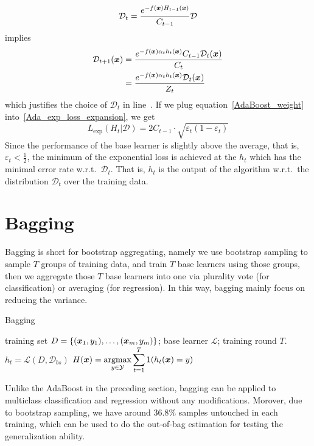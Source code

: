 $$\mathcal{D}_t = \frac{e^{-f(\boldsymbol{x})H_{t-1}(\boldsymbol{x})}}{C_{t-1}} \mathcal{D}$$
implies
\begin{align}
\mathcal{D}_{t+1}(\boldsymbol{x}) &= \frac{e^{-f(\boldsymbol{x})\alpha_t h_t(\boldsymbol{x})}C_{t-1}\mathcal{D}_t(\boldsymbol{x})}{C_t}\nonumber\\
                         &= \frac{e^{-f(\boldsymbol{x})\alpha_t h_t(\boldsymbol{x})}\mathcal{D}_t(\boldsymbol{x})}{Z_t}
\end{align}
which justifies the choice of $\mathcal{D}_t$ in line~. If we plug
equation~\eqref{AdaBoost_weight} into~\eqref{Ada_exp_loss_expansion}, we get
$$L_{\exp}(H_t | \mathcal{D}) = 2C_{t-1}\cdot\sqrt{\varepsilon_t (1-\varepsilon_t)}$$
Since the performance of the base learner is slightly above the average, that is, 
$\varepsilon_t < \frac{1}{2}$, the minimum of the exponential loss is achieved at the $h_t$ which has 
the minimal error rate w.r.t.\ $\mathcal{D}_t$. That is, $h_t$ is the output of the algorithm w.r.t.\ the 
distribution $\mathcal{D}_t$ over the training data.


\section{Bagging}
Bagging is short for bootstrap aggregating, namely we use bootstrap sampling to sample $T$ groups of training
data, and train $T$ base learners using those groups, then we aggregate those $T$ base learners into one via 
plurality vote (for classification) or averaging (for regression). In this way, bagging mainly focus on
reducing the variance.

\begin{algorithm}
    \caption{Bagging}\label{Bagging}
    \begin{algorithmic}[1]
        \Require training set $D = \{(\boldsymbol{x}_1, y_1), \dotsc, (\boldsymbol{x}_m, y_m)\}$; base learner $\mathcal{L}$;
        training round $T$.
            \State $h_t = \mathcal{L}(D, \mathcal{D}_{bs})$ 
        \EndFor
        \Ensure $H(\boldsymbol{x}) = \displaystyle\operatorname*{argmax}_{y\in \mathcal{Y}}\sum_{t=1}^T 1(h_t(\boldsymbol{x}) = y)$
    \end{algorithmic}
\end{algorithm}

Unlike the AdaBoost in the preceding section, bagging can be applied to multiclass classification and
regression without any modifications. Morover, due to bootstrap sampling, we have around $36.8\%$ samples
untouched in each training, which can be used to do the out-of-bag estimation for testing the generalization
ability.

